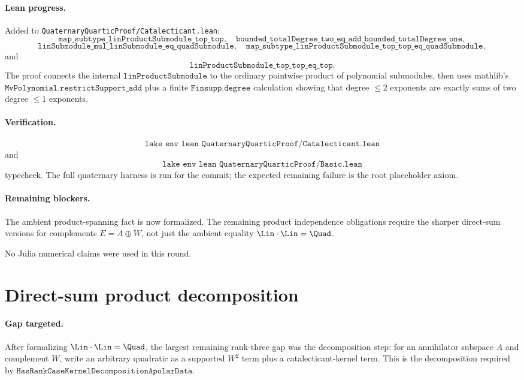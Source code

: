 \documentclass[11pt]{article}
\begin{document}
\paragraph{Lean progress.}
Added to \texttt{QuaternaryQuarticProof/Catalecticant.lean}:
\[
\texttt{map\_subtype\_linProductSubmodule\_top\_top},
\quad
\texttt{bounded\_totalDegree\_two\_eq\_add\_bounded\_totalDegree\_one},
\]
\[
\texttt{linSubmodule\_mul\_linSubmodule\_eq\_quadSubmodule},
\quad
\texttt{map\_subtype\_linProductSubmodule\_top\_top\_eq\_quadSubmodule},
\]
and
\[
\texttt{linProductSubmodule\_top\_top\_eq\_top}.
\]
The proof connects the internal \(\texttt{linProductSubmodule}\) to the
ordinary pointwise product of polynomial submodules, then uses mathlib's
\(\texttt{MvPolynomial.restrictSupport\_add}\) plus a finite
\(\texttt{Finsupp.degree}\) calculation showing that degree \(\le 2\)
exponents are exactly sums of two degree \(\le 1\) exponents.

\paragraph{Verification.}
\[
\texttt{lake env lean QuaternaryQuarticProof/Catalecticant.lean}
\]
and
\[
\texttt{lake env lean QuaternaryQuarticProof/Basic.lean}
\]
typecheck.  The full quaternary harness is run for the commit; the expected
remaining failure is the root placeholder axiom.

\paragraph{Remaining blockers.}
The ambient product-spanning fact is now formalized.  The remaining product
independence obligations require the sharper direct-sum versions for
complements \(E=A\oplus W\), not just the ambient equality
\(\Lin\cdot\Lin=\Quad\).

No Julia numerical claims were used in this round.

\section*{Direct-sum product decomposition}

\paragraph{Gap targeted.}
After formalizing \(\Lin\cdot\Lin=\Quad\), the largest remaining rank-three
gap was the decomposition step: for an annihilator subspace \(A\) and
complement \(W\), write an arbitrary quadratic as a supported \(W^2\) term
plus a catalecticant-kernel term.  This is the decomposition required by
\(\texttt{HasRankCaseKernelDecompositionApolarData}\).
\end{document}
